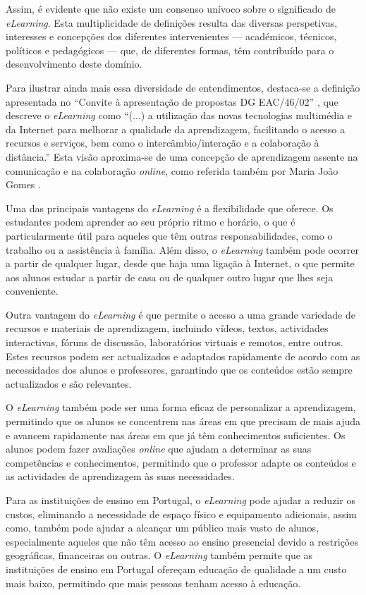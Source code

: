 Assim, é evidente que não existe um consenso unívoco sobre o significado de \textit{eLearning}. Esta multiplicidade de definições resulta das diversas perspetivas, interesses e concepções dos diferentes intervenientes — académicos, técnicos, políticos e pedagógicos — que, de diferentes formas, têm contribuído para o desenvolvimento deste domínio.

Para ilustrar ainda mais essa diversidade de entendimentos, destaca-se a definição apresentada no ``Convite à apresentação de propostas DG EAC/46/02'' \cite{comissao197_07}, que descreve o \textit{eLearning} como ``(...) a utilização das novas tecnologias multimédia e da Internet para melhorar a qualidade da aprendizagem, facilitando o acesso a recursos e serviços, bem como o intercâmbio/interação e a colaboração à distância.'' Esta visão aproxima-se de uma concepção de aprendizagem assente na comunicação e na colaboração \textit{online}, como referida também por Maria João Gomes \cite{gomes_e-learning_2005}.

Uma das principais vantagens do \textit{eLearning} é a flexibilidade que oferece. Os estudantes podem aprender ao seu próprio ritmo e horário, o que é particularmente útil para aqueles que têm outras responsabilidades, como o trabalho ou a assistência à família. Além disso, o \textit{eLearning} também pode ocorrer a partir de qualquer lugar, desde que haja uma ligação à Internet, o que permite aos alunos estudar a partir de casa ou de qualquer outro lugar que lhes seja conveniente.

Outra vantagem do \textit{eLearning} é que permite o acesso a uma grande variedade de recursos e materiais de aprendizagem, incluindo vídeos, textos, actividades interactivas, fóruns de discussão, laboratórios virtuais e remotos, entre outros. Estes recursos podem ser actualizados e adaptados rapidamente de acordo com as necessidades dos alunos e professores, garantindo que os conteúdos estão sempre actualizados e são relevantes.

O \textit{eLearning} também pode ser uma forma eficaz de personalizar a aprendizagem, permitindo que os alunos se concentrem nas áreas em que precisam de mais ajuda e avancem rapidamente nas áreas em que já têm conhecimentos suficientes. Os alunos podem fazer avaliações \textit{online} que ajudam a determinar as suas competências e conhecimentos, permitindo que o professor adapte os conteúdos e as actividades de aprendizagem às suas necessidades.

Para as instituições de ensino em Portugal, o \textit{eLearning} pode ajudar a reduzir os custos, eliminando a necessidade de espaço físico e equipamento adicionais, assim como, também pode ajudar a alcançar um público mais vasto de alunos, especialmente aqueles que não têm acesso ao ensino presencial devido a restrições geográficas, financeiras ou outras. O \textit{eLearning} também permite que as instituições de ensino em Portugal ofereçam educação de qualidade a um custo mais baixo, permitindo que mais pessoas tenham acesso à educação.

